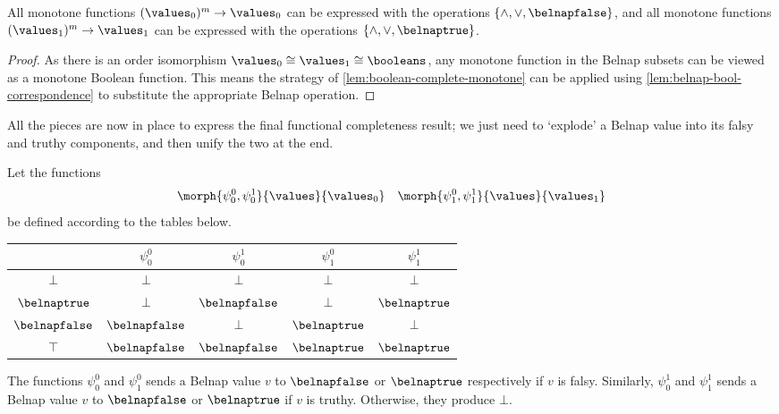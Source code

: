 \begin{corollary}\label{cor:func-complete-falsy-truthy}
    All monotone functions \((\values_0)^m \to \values_0\) can be expressed
    with the operations \(\{\land,\lor,\belnapfalse\}\), and all monotone
    functions \((\values_1)^m \to \values_1\) can be expressed with the
    operations \(\{\land,\lor,\belnaptrue\}\).
\end{corollary}
\begin{proof}
    As there is an order isomorphism
    \(\values_0 \cong \values_1 \cong \booleans\), any monotone function in
    the Belnap subsets can be viewed as a monotone Boolean function.
    This means the strategy of \cref{lem:boolean-complete-monotone} can
    be applied using \cref{lem:belnap-bool-correspondence} to substitute the
    appropriate Belnap operation.
\end{proof}

All the pieces are now in place to express the final functional completeness
result; we just need to `explode' a Belnap value into its falsy and truthy
components, and then unify the two at the end.

\begin{definition}
    \label{def:translation-tables}
    Let the functions \[
        \morph{\psi^0_0,\psi^1_0}{\values}{\values_0}
        \quad
        \morph{\psi^0_1,\psi^1_1}{\values}{\values_1}
    \] be defined according to the tables below.
    \begin{center}
        \begin{tabular}{c|cccc}
                             & \(\psi^0_0\)     & \(\psi^1_0\)     & \(\psi^0_1\)    & \(\psi^1_1\)    \\
            \hline
            \(\bot\)         & \(\bot\)         & \(\bot\)         & \(\bot\)        & \(\bot\)        \\
            \(\belnaptrue\)  & \(\bot\)         & \(\belnapfalse\) & \(\bot\)        & \(\belnaptrue\) \\
            \(\belnapfalse\) & \(\belnapfalse\) & \(\bot\)         & \(\belnaptrue\) & \(\bot\)        \\
            \(\top\)         & \(\belnapfalse\) & \(\belnapfalse\) & \(\belnaptrue\) & \(\belnaptrue\) \\
        \end{tabular}
    \end{center}
\end{definition}

The functions \(\psi^0_0\) and \(\psi^0_1\) sends a Belnap value \(v\) to
\(\belnapfalse\) or \(\belnaptrue\) respectively if \(v\) is falsy.
Similarly, \(\psi^1_0\) and \(\psi^1_1\) sends a Belnap value \(v\) to
\(\belnapfalse\) or \(\belnaptrue\) if \(v\) is truthy.
Otherwise, they produce \(\bot\).

